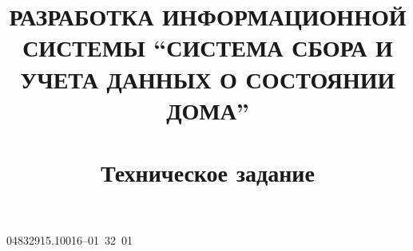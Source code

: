 \documentclass[a4paper,12pt]{article}
\begin{document}
\sloppy
\title{РАЗРАБОТКА ИНФОРМАЦИОННОЙ СИСТЕМЫ “СИСТЕМА СБОРА И УЧЕТА ДАННЫХ О СОСТОЯНИИ ДОМА”\\
~\\
Техническое задание}

\begin{uspd}{04832915.10016--01~32~01}



\end{uspd}
\end{document}

